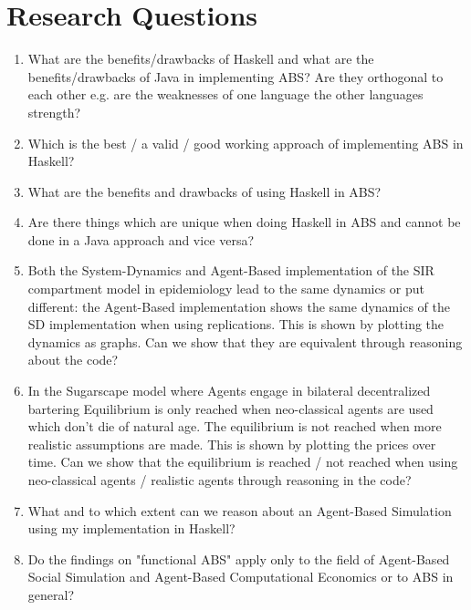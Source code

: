 \section{Research Questions}
\begin{enumerate}
	\item What are the benefits/drawbacks of Haskell and what are the benefits/drawbacks of Java in implementing ABS? Are they orthogonal to each other e.g. are the weaknesses of one language the other languages strength?

	\item Which is the best / a valid / good working approach of implementing ABS in Haskell?
	
	\item What are the benefits and drawbacks of using Haskell in ABS?

	\item Are there things which are unique when doing Haskell in ABS and cannot be done in a Java approach and vice versa?
	
	\item Both the System-Dynamics and Agent-Based implementation of the SIR compartment model in epidemiology lead to the same dynamics or put different: the Agent-Based implementation shows the same dynamics of the SD implementation when using replications. This is shown by plotting the dynamics as graphs. Can we show that they are equivalent through reasoning about the code?
	
	\item In the Sugarscape model where Agents engage in bilateral decentralized bartering Equilibrium is only reached when neo-classical agents are used which don't die of natural age. The equilibrium is not reached when more realistic assumptions are made. This is shown by plotting the prices over time. Can we show that the equilibrium is reached / not reached when using neo-classical agents / realistic agents through reasoning in the code?
	
	\item What and to which extent can we reason about an Agent-Based Simulation using my implementation in Haskell?
	
	\item Do the findings on "functional ABS" apply only to the field of Agent-Based Social Simulation and Agent-Based Computational Economics or to ABS in general?
\end{enumerate}